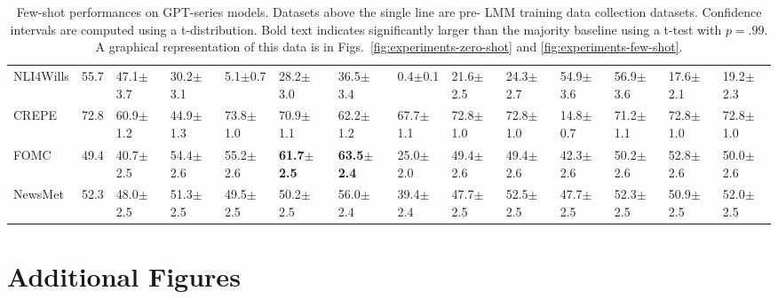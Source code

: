 \documentclass[letterpaper]{article} %
\begin{document}
\begin{table}[h!]
{\begin{tabular}{l||llllll||lllllll}
  NLI4Wills &     55.7 &           47.1$\pm$3.7 &           30.2$\pm$3.1 &            5.1$\pm$0.7 &           28.2$\pm$3.0 &           36.5$\pm$3.4 &            0.4$\pm$0.1 &           21.6$\pm$2.5 &           24.3$\pm$2.7 &           \multicolumn{1}{|l}{54.9$\pm$3.6} &           56.9$\pm$3.6 &           17.6$\pm$2.1 &           19.2$\pm$2.3 \\ \cline{11-14}
        CREPE &     72.8 &           60.9$\pm$1.2 &           44.9$\pm$1.3 &           73.8$\pm$1.0 &           70.9$\pm$1.1 &           62.2$\pm$1.2 &           67.7$\pm$1.1 &           72.8$\pm$1.0 &           72.8$\pm$1.0 &           14.8$\pm$0.7 &           71.2$\pm$1.1 &           72.8$\pm$1.0 &           72.8$\pm$1.0 \\
       FOMC &     49.4 &           40.7$\pm$2.5 &           54.4$\pm$2.6 &           55.2$\pm$2.6 &  \textbf{61.7$\pm$2.5} &  \textbf{63.5$\pm$2.4} &           25.0$\pm$2.0 &           49.4$\pm$2.6 &           49.4$\pm$2.6 &           42.3$\pm$2.6 &           50.2$\pm$2.6 &           52.8$\pm$2.6 &           50.0$\pm$2.6 \\
    NewsMet &     52.3 &           48.0$\pm$2.5 &           51.3$\pm$2.5 &           49.5$\pm$2.5 &           50.2$\pm$2.5 &           56.0$\pm$2.4 &           39.4$\pm$2.4 &           47.7$\pm$2.5 &           52.5$\pm$2.5 &           47.7$\pm$2.5 &           52.3$\pm$2.5 &           50.9$\pm$2.5 &           52.0$\pm$2.5 \\
\end{tabular}}
\caption{Few-shot performances on GPT-series models. Datasets above the single line are pre- LMM training data collection datasets. Confidence intervals are computed using a t-distribution. Bold text indicates significantly larger than the majority baseline using a t-test with $p=.99$. A graphical representation of this data is in Figs.~\ref{fig:experiments-zero-shot} and \ref{fig:experiments-few-shot}.}
\label{tab:few-shot}
\end{table}

\section{Additional Figures}
\end{document}
